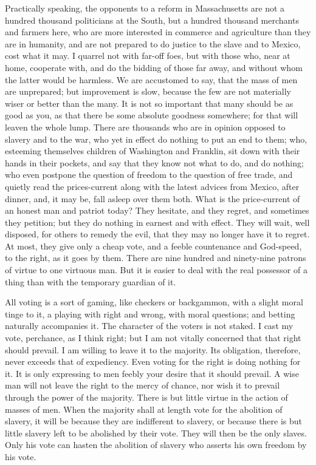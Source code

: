 \documentclass[letterpaper,12pt,english]{sphinxmanual}
\begin{document}
Practically speaking, the opponents to a reform in Massachusetts are not a hundred thousand politicians at the South, but a hundred thousand merchants and farmers here, who are more interested in commerce and agriculture than they are in humanity, and are not prepared to do justice to the slave and to Mexico, cost what it may. I quarrel not with far-off foes, but with those who, near at home, cooperate with, and do the bidding of those far away, and without whom the latter would be harmless. We are accustomed to say, that the mass of men are unprepared; but improvement is slow, because the few are not materially wiser or better than the many. It is not so important that many should be as good as you, as that there be some absolute goodness somewhere; for that will leaven the whole lump. There are thousands who are in opinion opposed to slavery and to the war, who yet in effect do nothing to put an end to them; who, esteeming themselves children of Washington and Franklin, sit down with their hands in their pockets, and say that they know not what to do, and do nothing; who even postpone the question of freedom to the question of free trade, and quietly read the prices-current along with the latest advices from Mexico, after dinner, and, it may be, fall asleep over them both. What is the price-current of an honest man and patriot today? They hesitate, and they regret, and sometimes they petition; but they do nothing in earnest and with effect. They will wait, well disposed, for others to remedy the evil, that they may no longer have it to regret. At most, they give only a cheap vote, and a feeble countenance and God-speed, to the right, as it goes by them. There are nine hundred and ninety-nine patrons of virtue to one virtuous man. But it is easier to deal with the real possessor of a thing than with the temporary guardian of it.

All voting is a sort of gaming, like checkers or backgammon, with a slight moral tinge to it, a playing with right and wrong, with moral questions; and betting naturally accompanies it. The character of the voters is not staked. I cast my vote, perchance, as I think right; but I am not vitally concerned that that right should prevail. I am willing to leave it to the majority. Its obligation, therefore, never exceeds that of expediency. Even voting for the right is doing nothing for it. It is only expressing to men feebly your desire that it should prevail. A wise man will not leave the right to the mercy of chance, nor wish it to prevail through the power of the majority. There is but little virtue in the action of masses of men. When the majority shall at length vote for the abolition of slavery, it will be because they are indifferent to slavery, or because there is but little slavery left to be abolished by their vote. They will then be the only slaves. Only his vote can hasten the abolition of slavery who asserts his own freedom by his vote.
\end{document}
